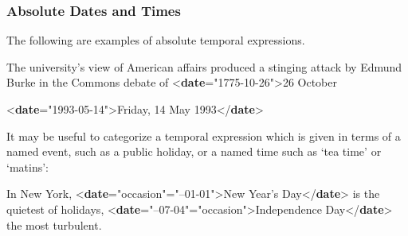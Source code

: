 \subsubsection[{Absolute Dates and Times}]{Absolute Dates and Times}\label{NDDATEA}\par
The following are examples of absolute temporal expressions.\par
\par\bgroup{}\exampleFont \begin{shaded}\noindent\mbox{}The university's view of American affairs\mbox{}\newline 
 produced a stinging attack by Edmund Burke in the Commons debate of {<\textbf{date}\hspace*{1em}{when}="{1775-10-26}">}26 October\mbox{}\end{shaded}\egroup\par \noindent  \par\bgroup{}\exampleFont \begin{shaded}\noindent\mbox{}{<\textbf{date}\hspace*{1em}{when}="{1993-05-14}">}Friday, 14 May 1993{</\textbf{date}>}\end{shaded}\egroup\par \par
It may be useful to categorize a temporal expression which is given in terms of a named event, such as a public holiday, or a named time such as ‘tea time’ or ‘matins’: \par\bgroup{}\exampleFont \begin{shaded}\noindent\mbox{}In\mbox{}\newline 
 New York, {<\textbf{date}\hspace*{1em}{type}="{occasion}"\hspace*{1em}{when}="{--01-01}">}New Year's Day{</\textbf{date}>} is the quietest of holidays, {<\textbf{date}\hspace*{1em}{when}="{--07-04}"\hspace*{1em}{type}="{occasion}">}Independence Day{</\textbf{date}>} the most turbulent.\end{shaded}\egroup\par \par
